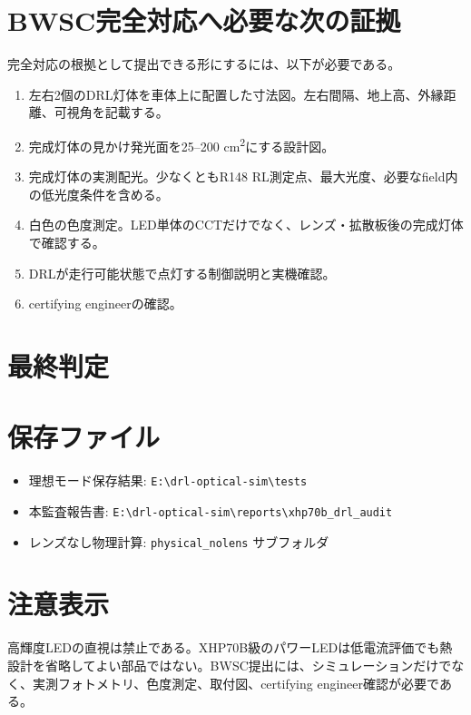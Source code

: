 \documentclass[11pt,a4paper]{article}
\begin{document}
\section{BWSC完全対応へ必要な次の証拠}
完全対応の根拠として提出できる形にするには、以下が必要である。

\begin{enumerate}
\item 左右2個のDRL灯体を車体上に配置した寸法図。左右間隔、地上高、外縁距離、可視角を記載する。
\item 完成灯体の見かけ発光面を25--200 cm\textsuperscript{2}にする設計図。
\item 完成灯体の実測配光。少なくともR148 RL測定点、最大光度、必要なfield内の低光度条件を含める。
\item 白色の色度測定。LED単体のCCTだけでなく、レンズ・拡散板後の完成灯体で確認する。
\item DRLが走行可能状態で点灯する制御説明と実機確認。
\item certifying engineerの確認。
\end{enumerate}

\section{最終判定}
\begin{center}
\end{center}

\appendix
\section{保存ファイル}
\begin{itemize}
\item 理想モード保存結果: \texttt{E:\textbackslash drl-optical-sim\textbackslash tests}
\item 本監査報告書: \texttt{E:\textbackslash drl-optical-sim\textbackslash reports\textbackslash xhp70b\_drl\_audit}
\item レンズなし物理計算: \texttt{physical\_nolens} サブフォルダ
\end{itemize}

\section{注意表示}
高輝度LEDの直視は禁止である。XHP70B級のパワーLEDは低電流評価でも熱設計を省略してよい部品ではない。BWSC提出には、シミュレーションだけでなく、実測フォトメトリ、色度測定、取付図、certifying engineer確認が必要である。
\end{document}
